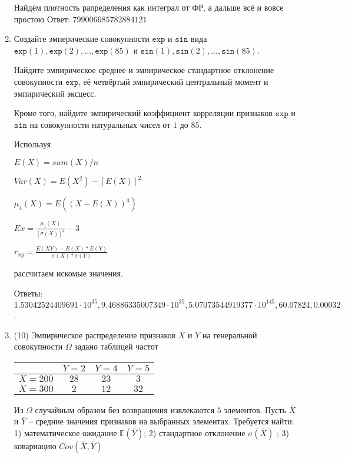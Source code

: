 \documentclass[a4paper,12pt]{article}
\begin{document}
\begin{enumerate}
Найдём плотность рапределения как интеграл от ФР, а дальше всё и вовсе простою Ответ: $799006685782884121$


\item

    
    Создайте эмперические совокупности  $\mathtt{\text{exp}}$ и $\mathtt{\text{sin}}$ вида $\mathtt{\text{exp}}(1),\mathtt{\text{exp}}(2), ..., \mathtt{\text{exp}}(85) $ и $\mathtt{\text{sin}}(1),\mathtt{\text{sin}}(2), ..., \mathtt{\text{sin}}(85). $

    Найдите эмпирическое среднее и эмпирическое стандартное отклонение совокупности $\mathtt{\text{exp}}$, её четвёртый эмпирический центральный момент и эмпирический эксцесс.

    Кроме того, найдите эмпирический коэффициент корреляции признаков $\mathtt{\text{exp}}$ и $\mathtt{\text{sin}}$ на совокупности натуральных чисел от $1$ до $85$.
    


    
    Используя

	$E(X) = sum(X) / n$

	$Var(X) = E(X^2) - [E(X)]^2$

	$\mu_4(X) = E((X-E(X))^4)$

	$Ex = \frac{\mu_4(X)}{[\sigma(X)]^4} - 3$

	$r_{xy} = \frac{E(XY) - E(X) * E(Y)}{\sigma(X) * \sigma(Y)}$

    рассчитаем искомые значения.

    Ответы: $1.53042524409691 \cdot 10^{35}, 9.46886335007349 \cdot 10^{35}, 5.07073544919377 \cdot 10^{145}, 60.07824, 0.00032$.

    

\item


(10) Эмпирическое распределение признаков $X$ и $Y$ на генеральной совокупности $\Omega$ задано таблицей частот  
 
\begin{tabular}{ | c | c | c | c | }
\hline
 & $Y = 2$ & $Y = 4$ & $Y = 5$  \\ \hline
$X = 200$ & $28$ & $23$ & $3$\\ \hline
$X = 300$ & $2$ & $12$ & $32$\\
\hline
\end{tabular}

Из $\Omega$ случайным образом без возвращения извлекаются $5$ элементов. 
Пусть $\bar X$ и $\bar Y$ – средние значения признаков на выбранных элементах. 
Требуется найти: 1) математическое ожидание $\mathbb{E}(\bar Y)$; 2) стандартное отклонение $\sigma(\bar X)$ ; 
3) ковариацию $Cov(\bar X, \bar Y)$





\end{enumerate}
\end{document}
